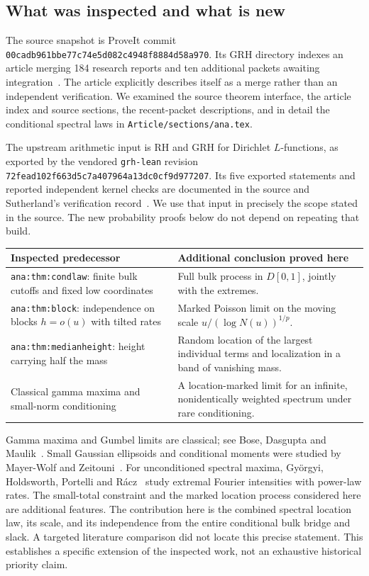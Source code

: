 \documentclass[11pt]{article}
\theoremstyle{definition}
\theoremstyle{remark}
\begin{document}
\subsection{What was inspected and what is new}

The source snapshot is ProveIt commit
\texttt{00cadb961bbe77c74e5d082c4948f8884d58a970}. Its GRH directory indexes
an article merging 184 research reports and ten additional packets awaiting
integration~\cite{ProveIt2026}. The article explicitly describes itself as a
merge rather than an independent verification. We examined the source
theorem interface, the article index and source sections, the recent-packet
descriptions, and in detail the conditional spectral laws in
\texttt{Article/sections/ana.tex}.

The upstream arithmetic input is RH and GRH for Dirichlet $L$-functions,
as exported by the vendored \texttt{grh-lean} revision
\texttt{72fead102f663d5c7a407964a13dc0cf9d977207}. Its five exported statements
and reported independent kernel checks are documented in the source and
Sutherland's verification record~\cite{Sutherland2026}. We use that input
in precisely the scope stated in the source. The new probability proofs
below do not depend on repeating that build.

\begin{center}
\begin{tabular}{@{}p{}p{}@{}}
\toprule
Inspected predecessor & Additional conclusion proved here\\
\midrule
\texttt{ana:thm:condlaw}: finite bulk cutoffs and fixed low coordinates
& Full bulk process in $D[0,1]$, jointly with the extremes.\\[5pt]
\texttt{ana:thm:block}: independence on blocks $h=o(u)$ with tilted rates
& Marked Poisson limit on the moving scale $u/(\log N(u))^{1/p}$.\\[5pt]
\texttt{ana:thm:medianheight}: height carrying half the mass
& Random location of the largest individual terms and localization in a
band of vanishing mass.\\[5pt]
Classical gamma maxima and small-norm conditioning
& A location-marked limit for an infinite, nonidentically weighted spectrum
under rare conditioning.\\
\bottomrule
\end{tabular}
\end{center}

Gamma maxima and Gumbel limits are classical; see Bose, Dasgupta and
Maulik~\cite{Bose2008}. Small Gaussian ellipsoids and conditional moments
were studied by Mayer-Wolf and Zeitouni~\cite{MayerWolf1993}. For
unconditioned spectral maxima, Gy\"orgyi,
Holdsworth, Portelli and R\'acz~\cite{Gyorgyi2003} study extremal Fourier
intensities with power-law rates. The small-total constraint and the
marked location process considered here are additional features. The contribution
here is the combined spectral location law, its scale, and its independence
from the entire conditional bulk bridge and slack. A targeted literature
comparison did not locate this precise statement. This establishes a
specific extension of the inspected work, not an exhaustive historical
priority claim.
\end{document}
